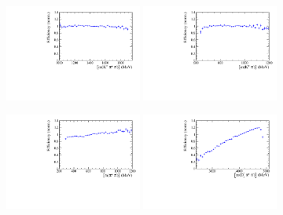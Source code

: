 

\begin{figure}[h]
\centering
\includegraphics[height=!,width=0.4\textwidth]{figs/AcceptancePhsp/eff_Kpipi.pdf}
\includegraphics[height=!,width=0.4\textwidth]{figs/AcceptancePhsp/eff_Kpi.pdf}

\includegraphics[height=!,width=0.4\textwidth]{figs/AcceptancePhsp/eff_pipi.pdf}
\includegraphics[height=!,width=0.4\textwidth]{figs/AcceptancePhsp/eff_Dspipi.pdf}


\end{figure}
